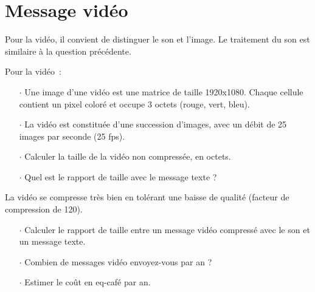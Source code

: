 \documentclass[a4paper]{article}
\begin{document}



\section{Message vidéo}

Pour la vidéo, il convient de distinguer le son et l'image. Le traitement du son est similaire à la question précédente.

Pour la vidéo~:

\begin{itemize}
\item[$\cdot$] Une image d'une vidéo est une matrice de taille 1920x1080. Chaque cellule contient un pixel coloré et occupe 3 octets (rouge, vert, bleu).
\item[$\cdot$] La vidéo est constituée d'une succession d'images, avec un débit de 25 images par seconde (25 fps).
\item[$\cdot$] Calculer la taille de la vidéo non compressée, en octets.
\item[$\cdot$] Quel est le rapport de taille avec le message texte ?
\end{itemize}

La vidéo se compresse très bien en tolérant une baisse de qualité  (facteur de compression de 120).

\begin{itemize}
\item[$\cdot$] Calculer le rapport de taille entre un message vidéo compressé avec le son et un message texte.
\item[$\cdot$] Combien de messages vidéo envoyez-vous par an ?
\item[$\cdot$] Estimer le coût en eq-café par an.
\end{itemize}
\end{document}
